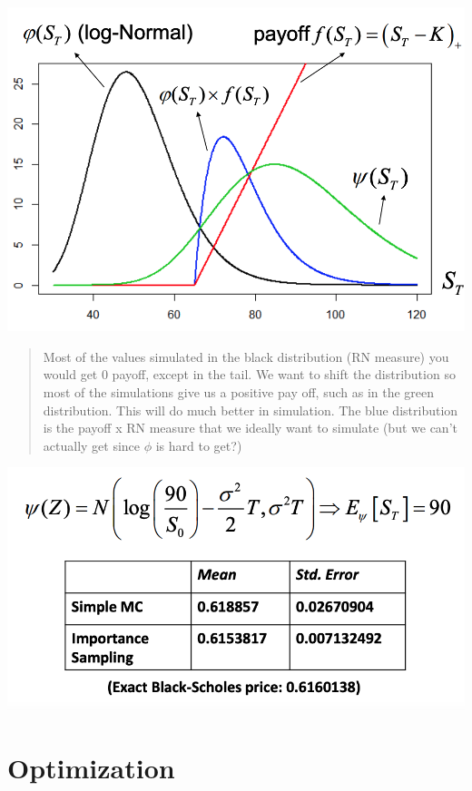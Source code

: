 \documentclass[
  oneside]{book}
\begin{document}
\includegraphics{Notes/Obsidian-Attachments/12-Simulation-Variance-Reduction-5.png}

\begin{quote}
Most of the values simulated in the black distribution (RN measure) you would get 0 payoff, except in the tail. We want to shift the distribution so most of the simulations give us a positive pay off, such as in the green distribution. This will do much better in simulation.
The blue distribution is the payoff x RN measure that we ideally want to simulate (but we can't actually get since \(\phi\) is hard to get?)
\end{quote}

\includegraphics{Notes/Obsidian-Attachments/12-Simulation-Variance-Reduction-6.png}

\hypertarget{optimization}{%
\chapter{Optimization}\label{optimization}}
\end{document}
